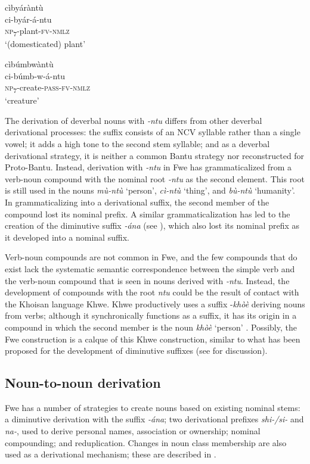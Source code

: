 \ea
\label{bkm:Ref98856312}
\glll cìbyáràntù\\
ci-byár-á-ntu\\
\textsc{np}\textsubscript{7}-plant-\textsc{fv}-\textsc{nmlz}\\
\glt ‘(domesticated) plant’
\z

\ea
\label{bkm:Ref98856313}
\glll cìbúmbwàntù\\
ci-búmb-w-á-ntu\\
\textsc{np}\textsubscript{7}-create-\textsc{pass}-\textsc{fv}-\textsc{nmlz}\\
\glt ‘creature’
\z

The derivation of deverbal nouns with \textit{-ntu} differs from other deverbal derivational processes: the suffix consists of an NCV syllable rather than a single vowel; it adds a high tone to the second stem syllable; and as a deverbal derivational strategy, it is neither a common Bantu strategy nor reconstructed for Proto-Bantu. Instead, derivation with \textit{-ntu} in Fwe has grammaticalized from a verb-noun compound with the nominal root \textit{-ntu} as the second element. This root is still used in the nouns \textit{mù-ntù} ‘person’, \textit{cì-ntù} ‘thing’, and \textit{bù-ntù} ‘humanity’. In grammaticalizing into a derivational suffix, the second member of the compound lost its nominal prefix. A similar grammaticalization has led to the creation of the diminutive suffix \textit{-ána} (see ), which also lost its nominal prefix as it developed into a nominal suffix.

Verb-noun compounds are not common in Fwe, and the few compounds that do exist lack the systematic semantic correspondence between the simple verb and the verb-noun compound that is seen in nouns derived with \textit{-ntu}. Instead, the development of compounds with the root \textit{\-ntu} could be the result of contact with the Khoisan language Khwe. Khwe productively uses a suffix -\textit{khòè} deriving nouns from verbs; although it synchronically functions as a suffix, it has its origin in a compound in which the second member is the noun \textit{khòè} ‘person’ \citep[90-91]{Kilian-Hatz2008}. Possibly, the Fwe construction is a calque of this Khwe construction, similar to what has been proposed for the development of diminutive suffixes (see  for discussion).

\subsection{Noun-to-noun derivation}
\label{bkm:Ref450750897}\hypertarget{Toc75352644}{}
Fwe has a number of strategies to create nouns based on existing nominal stems: a diminutive derivation with the suffix \textit{-ána}; two derivational prefixes \textit{shi-/si-} and \textit{na-}, used to derive personal names, association or ownership; nominal compounding; and reduplication. Changes in noun class membership are also used as a derivational mechanism; these are described in .

